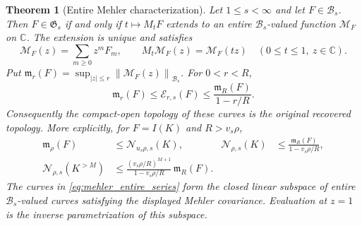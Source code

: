\documentclass[11pt,a4paper]{amsart}
\numberwithin{equation}{section}
\newtheorem{theorem}{Theorem}[section]
\theoremstyle{definition}
\theoremstyle{remark}
\newcommand{\C}{\mathbb C}
\newcommand{\Gaus}{\mathfrak G}
\newcommand{\norm}[1]{\left\lVert#1\right\rVert}
\newcommand{\Nn}[2]{\mathcal N_{#1,s}(#2)}
\newcommand{\En}[2]{\mathcal E_{#1,s}(#2)}
\begin{document}
\begin{theorem}[Entire Mehler characterization]\label{thm:mehler_entire}
Let $1\le s<\infty$ and let $F\in\mathscr B_s$. Then $F\in\Gaus_s$ if and only if $t\mapsto M_tF$ extends to an entire $\mathscr B_s$-valued function $\mathscr M_F$ on $\C$. The extension is unique and satisfies
\begin{equation}\label{eq:mehler_entire_series}
 \mathscr M_F(z)=\sum_{m\ge0}z^mF_m,
 \qquad M_t\mathscr M_F(z)=\mathscr M_F(tz)
 \quad(0\le t\le1,\ z\in\C).
\end{equation}
Put $\mathfrak m_r(F)=\sup_{|z|\le r}\norm{\mathscr M_F(z)}_{\mathscr B_s}$. For $0<r<R$,
\begin{equation}\label{eq:mehler_compact_open_norms}
 \mathfrak m_r(F)\le\En rF
 \le\frac{\mathfrak m_R(F)}{1-r/R}.
\end{equation}
Consequently the compact-open topology of these curves is the original recovered topology. More explicitly, for $F=I(K)$ and $R>v_s\rho$,
\begin{align}
 \mathfrak m_\rho(F)&\le\Nn{u_s\rho}K,&
 \Nn\rho K&\le\frac{\mathfrak m_R(F)}{1-v_s\rho/R},\label{eq:mehler_native_norms}\\
 \Nn\rho{K^{>M}}&\le
 \frac{(v_s\rho/R)^{M+1}}{1-v_s\rho/R}\,\mathfrak m_R(F).
 \label{eq:mehler_native_tail}
\end{align}
The curves in \eqref{eq:mehler_entire_series} form the closed linear subspace of entire $\mathscr B_s$-valued curves satisfying the displayed Mehler covariance. Evaluation at $z=1$ is the inverse parametrization of this subspace.
\end{theorem}
\end{document}
